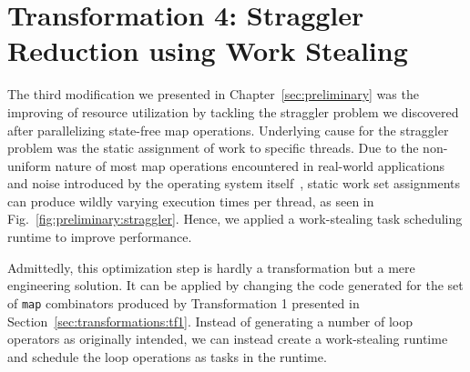 \section{Transformation 4: Straggler Reduction using Work Stealing}%
\label{sec:transformations:tf3}

The third modification we presented in Chapter~\ref{sec:preliminary} was the improving of resource utilization by tackling the straggler problem we discovered after parallelizing state-free map operations.
Underlying cause for the straggler problem was the static assignment of work to specific threads.
Due to the non-uniform nature of most map operations encountered in real-world applications and noise introduced by the operating system itself~\cite{lackorzynski2016decoupled}, static work set assignments can produce wildly varying execution times per thread, as seen in Fig.~\ref{fig:preliminary:straggler}.
Hence, we applied a work-stealing task scheduling runtime to improve performance.

Admittedly, this optimization step is hardly a transformation but a mere engineering solution.
It can be applied by changing the code generated for the set of \texttt{map} combinators produced by Transformation 1 presented in Section~\ref{sec:transformations:tf1}.
Instead of generating a number of loop operators as originally intended, we can instead create a work-stealing runtime and schedule the loop operations as tasks in the runtime.
